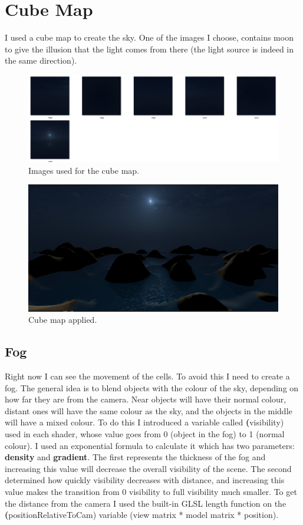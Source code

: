 \section{Cube Map}
I used a cube map to create the sky. One of the images I choose, contains moon to give the illusion that the light comes from there (the light source is indeed in the same direction).

\begin{figure}[hbt!]
	\centering
	\includegraphics[width= 1
	\textwidth]{images/Sky.png}
	\caption{Images used for the cube map.}
\end{figure}

\newpage

\begin{figure}[hbt!]
\centering
\includegraphics[width= 1
\textwidth]{images/Sky2.png}
\caption{Cube map applied.}
\end{figure}

\subsection{Fog}
Right now I can see the movement of the cells. To avoid this I need to create a fog. The general idea is to blend objects with the colour of the sky, depending on how far they are from the camera. Near objects will have their normal colour, distant ones will have the same colour as the sky, and the objects in the middle will have a mixed colour. To do this I introduced a variable called \textbf(visibility) used in each shader, whose value goes from 0 (object in the fog) to 1 (normal colour). I used an exponential formula to calculate it which has two parameters: \textbf{density} and \textbf{gradient}. The first represents the thickness of the fog and increasing this value will decrease the overall visibility of the scene. The second determined how quickly visibility decreases with distance, and increasing this value makes the transition from 0 visibility to full visibility much smaller. To get the distance from the camera I used the built-in GLSL length function on the \textbf(positionRelativeToCam) variable (view matrix * model matrix * position).

